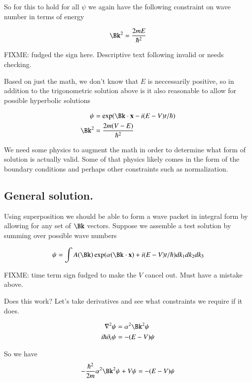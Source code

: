 \documentclass{article}
\begin{document}
So for this to hold for all $\psi$ we again have the following constraint on wave number in terms of energy

\begin{align*}
\Bk^2 = \frac{2 m E}{\hbar^2}
\end{align*}


FIXME: fudged the sign here.  Descriptive text following invalid or needs checking.

Based on just the math, we don't know that $E$ is neccessarily positive, so in addition to the trigonometric solution above is it also reasonable to
allow for possible
hyperbolic solutions

\begin{align*}
\psi &= \exp(\Bk \cdot \Bx - i(E - V) t/\hbar) \\
\Bk^2 &= \frac{2 m (V - E)}{\hbar^2}
\end{align*}

We need some physics
to augment the math in order to determine what form of solution is actually valid.  Some of that physics likely comes in the form of the boundary conditions and perhaps other constraints such as normalization.

\subsection{ General solution. }

Using superposition we should be able to form a wave packet in integral form
by allowing for any set of $\Bk$ vectors.  Suppose we assemble a test solution by summing over possible wave numbers

\begin{align*}
\psi = \int A(\Bk) \exp(\alpha(\Bk \cdot \Bx) + i(E - V) t/\hbar) dk_1 dk_2 dk_3 \\
\end{align*}

FIXME: time term sign fudged to make the $V$ cancel out.  Must have a mistake above.

Does this work?  Let's take derivatives and see what constraints we require if it does.

\begin{align*}
\grad^2 \psi &= \alpha^2 \Bk^2 \psi \\
i \hbar \partial_t \psi &= -(E - V) \psi
\end{align*}

So we have
\begin{align*}
-\frac{\hbar^2}{2m} \alpha^2 \Bk^2 \psi + V\psi = -(E-V) \psi
\end{align*}
\end{document}

